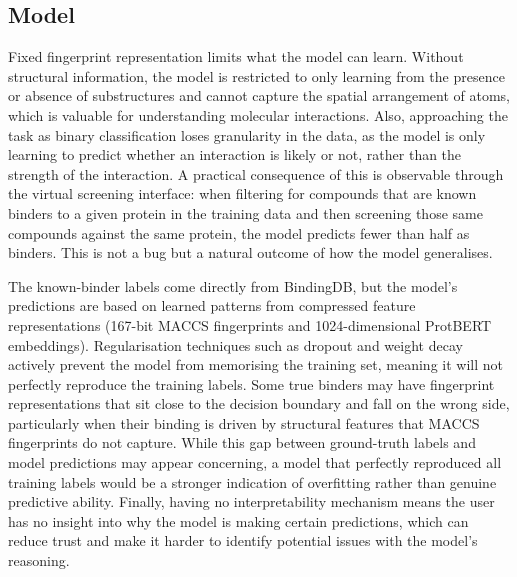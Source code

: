 \subsection{Model}
Fixed fingerprint representation limits what the model can learn.
Without structural information, the model is restricted to only learning from the presence or absence of substructures and cannot capture the spatial arrangement of atoms, which is valuable for understanding molecular interactions.
Also, approaching the task as binary classification loses granularity in the data, as the model is only learning to predict whether an interaction is likely or not, rather than the strength of the interaction.
A practical consequence of this is observable through the virtual screening interface: when filtering for compounds that are known binders to a given protein in the training data and then screening those same compounds against the same protein, the model predicts fewer than half as binders.
This is not a bug but a natural outcome of how the model generalises.

The known-binder labels come directly from BindingDB, but the model's predictions are based on learned patterns from compressed feature representations (167-bit MACCS fingerprints and 1024-dimensional ProtBERT embeddings).
Regularisation techniques such as dropout and weight decay actively prevent the model from memorising the training set, meaning it will not perfectly reproduce the training labels.
Some true binders may have fingerprint representations that sit close to the decision boundary and fall on the wrong side, particularly when their binding is driven by structural features that MACCS fingerprints do not capture.
While this gap between ground-truth labels and model predictions may appear concerning, a model that perfectly reproduced all training labels would be a stronger indication of overfitting rather than genuine predictive ability.
Finally, having no interpretability mechanism means the user has no insight into why the model is making certain predictions, which can reduce trust and make it harder to identify potential issues with the model's reasoning.
